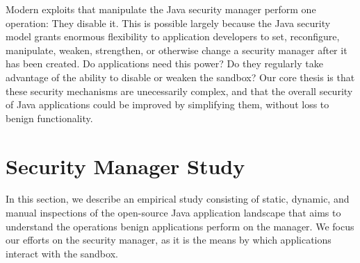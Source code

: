 \documentclass{sig-alternate}
\begin{document}
Modern exploits that manipulate the Java security manager perform one
operation: They disable it.  This is possible largely because the Java security model
grants enormous flexibility to application developers to
set, reconfigure, manipulate, weaken, strengthen, or otherwise change a security
manager after it has been created.
Do applications need this power?  Do they regularly take advantage of the
ability to disable or weaken the sandbox? %
Our core thesis is that these security mechanisms are unecessarily
complex, and that the overall security of Java applications could be improved by
simplifying them, without loss to benign functionality.

\section{Security Manager Study}\label{sec:Security-Manager-Study}

In this section, we describe an empirical study consisting of static,
dynamic, and manual inspections of the open-source Java application landscape
that aims to understand the operations benign applications perform on the
manager. We focus our efforts on the security manager, as it is the
means by which applications interact with the sandbox.
\end{document}
